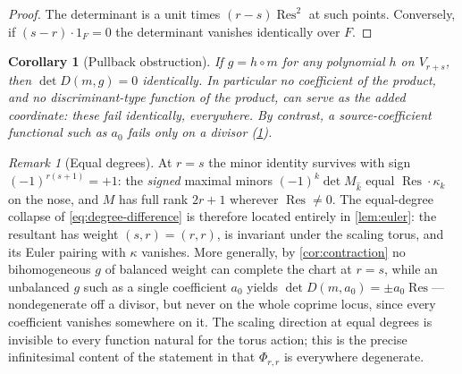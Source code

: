 \documentclass[11pt,reqno]{amsart}
\newtheorem{corollary}[corollary]{Corollary}
\theoremstyle{definition}
\theoremstyle{remark}
\newtheorem{remark}[remark]{Remark}
\newcommand{\Res}{\operatorname{Res}}
\begin{document}
\begin{proof}
The determinant is a unit times $(r-s)\Res^2$ at such points.
Conversely, if $(s-r)\cdot1_F=0$ the determinant vanishes identically
over $F$.
\end{proof}

\begin{corollary}[Pullback obstruction]\label{cor:pullback}
If $g=h\circ m$ for any polynomial $h$ on $V_{r+s}$, then
$\det D(m,g)=0$ identically.  In particular no coefficient of the
product, and no discriminant-type function of the product, can serve
as the added coordinate: these fail identically, everywhere.  By
contrast, a source-coefficient functional such as $a_0$ fails only
on a divisor (\cref{rem:equal-degree}).
\end{corollary}

\begin{remark}[Equal degrees]\label{rem:equal-degree}
At $r=s$ the minor identity survives with sign
$(-1)^{r(s+1)}=+1$: the \emph{signed} maximal minors
$(-1)^k\det M_{\hat k}$ equal
$\Res\cdot\kappa_k$ on the nose, and $M$ has full rank $2r+1$
wherever $\Res\ne0$.  The equal-degree collapse of
\eqref{eq:degree-difference} is therefore located entirely in
\cref{lem:euler}: the resultant has weight $(s,r)=(r,r)$, is
invariant under the scaling torus, and its Euler pairing with
$\kappa$ vanishes.  More generally, by \cref{cor:contraction} no
bihomogeneous $g$ of balanced weight can complete the chart at
$r=s$, while an unbalanced $g$ such as a single coefficient
$a_0$ yields $\det D(m,a_0)=\pm a_0\Res$---nondegenerate off a
divisor, but never on the whole coprime locus, since every
coefficient vanishes somewhere on it.  The scaling direction at equal
degrees is invisible to every function natural for the torus action;
this is the precise infinitesimal content of the statement in
\cite{DDAS} that $\Phi_{r,r}$ is everywhere degenerate.
\end{remark}
\end{document}
